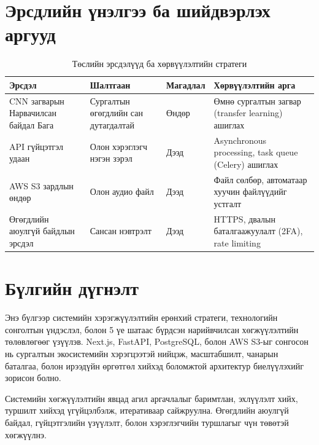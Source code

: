 \section{Эрсдлийн үнэлгээ ба шийдвэрлэх аргууд}

\begin{table}[!htbp]
\caption{Төслийн эрсдэлүүд ба хөрвүүлэлтийн стратеги}
\centering
\begin{tabular}{|p{3cm}|p{3cm}|p{2cm}|p{4cm}|}
\hline
\textbf{Эрсдэл} & \textbf{Шалтгаан} & \textbf{Магадлал} & \textbf{Хөрвүүлэлтийн арга} \\
\hline
CNN загварын Нарвачилсан байдал Бага & Сургалтын өгөгдлийн сан дутагдалтай & Өндөр & Өмнө сургалтын загвар (transfer learning) ашиглах \\
\hline
API гүйцэтгэл удаан & Олон хэрэглэгч нэгэн зэрэл & Дээд & Asynchronous processing, task queue (Celery) ашиглах \\
\hline
AWS S3 зардлын өндөр & Олон аудио файл & Дээд & Файл сөлбөр, автоматаар хуучин файлүүдийг устгалт \\
\hline
Өгөгдлийн аюулгүй байдлын эрсдэл & Сансан нэвтрэлт & Дээд & HTTPS, двалын баталгаажуулалт (2FA), rate limiting \\
\hline
\end{tabular}
\end{table}

\section{Бүлгийн дүгнэлт}

Энэ бүлгээр системийн хэрэгжүүлэлтийн ерөнхий стратеги, технологийн сонголтын үндэслэл, болон 5 үе шатаас бүрдсэн нарийвчилсан хөгжүүлэлтийн төлөвлөгөөг үзүүлэв. Next.js, FastAPI, PostgreSQL, болон AWS S3-ыг сонгосон нь сургалтын экосистемийн хэрэгцээтэй нийцэж, масштабшилт, чанарын баталгаа, болон ирээдүйн өргөтгөл хийхэд боломжтой архитектур биелүүлэхийг зорисон болно. 

Системийн хөгжүүлэлтийн явцад агил аргачлалыг баримтлан, эхлүүлэлт хийх, туршилт хийхэд үгүйцэлбэлж, итеративаар сайжруулна. Өгөгдлийн аюулгүй байдал, гүйцэтгэлийн үзүүлэлт, болон хэрэглэгчийн туршлагыг чүн төвөтэй хөгжүүлнэ.

